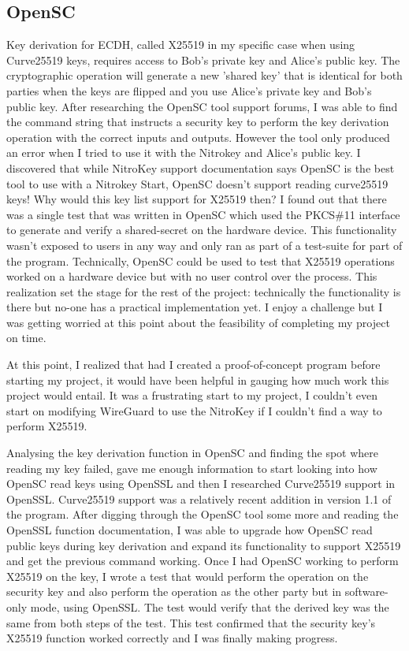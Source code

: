 \documentclass [11pt, proquest] {uwthesis}[2020/02/24]
\begin{document}
\subsection {OpenSC}
Key derivation for ECDH, called X25519 in my specific case when using Curve25519 keys, requires access to Bob's private key and Alice's public key. The cryptographic operation will generate a new 'shared key' that is identical for both parties when the keys are flipped and you use Alice's private key and Bob's public key. 
After researching the OpenSC tool support forums, I was able to find the command string that instructs a  security key to perform the key derivation operation with the correct inputs and outputs. However the tool only produced an error when I tried to use it with the Nitrokey and Alice's public key. I discovered that while NitroKey support documentation says OpenSC is the best tool to use with a Nitrokey Start, OpenSC doesn't support reading curve25519 keys! Why would this key list support for X25519 then? I found out that there was a single test that was written in OpenSC which used the PKCS\#11 interface to generate and verify a shared-secret on the hardware device. This functionality wasn't exposed to users in any way and only ran as part of a test-suite for part of the program. Technically, OpenSC could be used to test that X25519 operations worked on a hardware device but with no user control over the process. This realization set the stage for the rest of the project: technically the functionality is there but no-one has a practical implementation yet. I enjoy a challenge but I was getting worried at this point about the feasibility of completing my project on time.

At this point, I realized that had I created a proof-of-concept program before starting my project, it would have been helpful in gauging how much work this project would entail. It was a frustrating start to my project, I couldn't even start on modifying WireGuard to use the NitroKey if I couldn't find a way to perform X25519.

Analysing the key derivation function in OpenSC and finding the spot where reading my key failed, gave me enough information to start looking into how OpenSC read keys using OpenSSL and then I researched Curve25519 support in OpenSSL. Curve25519 support was a relatively recent addition in version 1.1 of the program\cite{noauthor_support_nodate}.
After digging through the OpenSC tool some more and reading the OpenSSL function documentation, I was able to upgrade how OpenSC read public keys during key derivation and expand its functionality to support X25519 and get the previous command working.
Once I had OpenSC working to perform X25519 on the key, I wrote a test that would perform the operation on the security key and also perform the operation as the other party but in software-only mode, using OpenSSL. The test would verify that the derived key was the same from both steps of the test. This test confirmed that the security key's X25519 function worked correctly and I was finally making progress.
\end{document}
